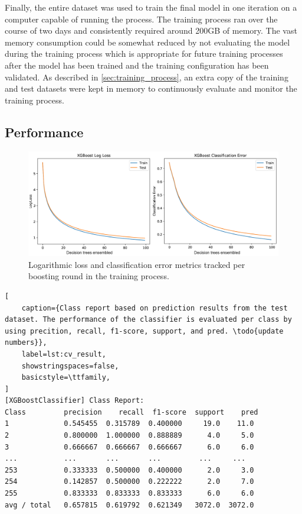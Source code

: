 Finally, the entire dataset was used to train the final model in one iteration on a computer capable of running the process. The training process ran over the course of two days and consistently required around 200GB of memory. The vast memory consumption could be somewhat reduced by not evaluating the model during the training process which is appropriate for future training processes after the model has been trained and the training configuration has been validated. As described in \cref{sec:training_process}, an extra copy of the training and test datasets were kept in memory to continuously evaluate and monitor the training process.

\subsection{Performance}

\begin{figure}[htbp]
    \centering
    \includegraphics[width=1.0\textwidth]{figures/results/eval_set}
    \caption{Logarithmic loss and classification error metrics tracked per boosting round in the training process.}
    \label{fig:eval_set}
\end{figure}


\begin{lstlisting}[
    caption={Class report based on prediction results from the test dataset. The performance of the classifier is evaluated per class by using precition, recall, f1-score, support, and pred. \todo{update numbers}},
    label=lst:cv_result,
    showstringspaces=false,
    basicstyle=\ttfamily,
]
[XGBoostClassifier] Class Report:
Class         precision    recall  f1-score  support    pred
1             0.545455  0.315789  0.400000     19.0    11.0
2             0.800000  1.000000  0.888889      4.0     5.0
3             0.666667  0.666667  0.666667      6.0     6.0
...           ...       ...       ...         ...     ...
253           0.333333  0.500000  0.400000      2.0     3.0
254           0.142857  0.500000  0.222222      2.0     7.0
255           0.833333  0.833333  0.833333      6.0     6.0
avg / total   0.657815  0.619792  0.621349   3072.0  3072.0
\end{lstlisting}


